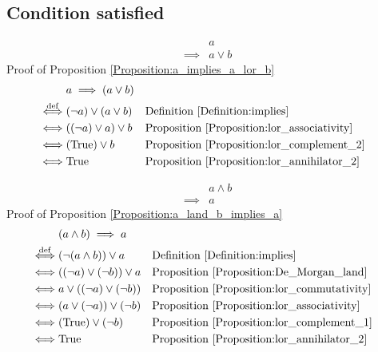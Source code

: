 \subsection{Condition satisfied}
\begin{prop}
\label{Proposition:a_implies_a_lor_b}
\begin{align*}
& a \\
\implies & a \lor b
\end{align*}
Proof of Proposition \ref{Proposition:a_implies_a_lor_b}
\begin{align*}
& a \implies (a \lor b) \\
\overset{\operatorname{def}}{\iff} & (\lnot a) \lor (a \lor b)
& & \text{Definition \ref{Definition:implies}} \\
\iff & ((\lnot a) \lor a) \lor b
& & \text{Proposition \ref{Proposition:lor_associativity}} \\
\iff & (\text{True}) \lor b
& & \text{Proposition \ref{Proposition:lor_complement_2}} \\
\iff & \text{True}
& & \text{Proposition \ref{Proposition:lor_annihilator_2}} \\
\end{align*}
\end{prop}

\begin{prop}
\label{Proposition:a_land_b_implies_a}
\begin{align*}
& a \land b \\
\implies & a
\end{align*}
Proof of Proposition \ref{Proposition:a_land_b_implies_a}
\begin{align*}
& (a \land b) \implies a \\
\overset{\operatorname{def}}{\iff} & (\lnot (a \land b)) \lor a
& & \text{Definition \ref{Definition:implies}} \\
\iff & ((\lnot a) \lor (\lnot b)) \lor a
& & \text{Proposition \ref{Proposition:De_Morgan_land}} \\
\iff & a \lor ((\lnot a) \lor (\lnot b))
& & \text{Proposition \ref{Proposition:lor_commutativity}} \\
\iff & (a \lor (\lnot a)) \lor (\lnot b)
& & \text{Proposition \ref{Proposition:lor_associativity}} \\
\iff & (\text{True}) \lor (\lnot b)
& & \text{Proposition \ref{Proposition:lor_complement_1}} \\
\iff & \text{True}
& & \text{Proposition \ref{Proposition:lor_annihilator_2}} \\
\end{align*}
\end{prop}

